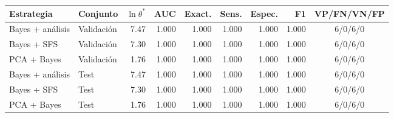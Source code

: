 \footnotesize
\begin{tabular}{llrrrrrrc}
\toprule
Estrategia & Conjunto & $\ln\theta^*$ & AUC & Exact. & Sens. & Espec. & F1 & VP/FN/VN/FP \\
\midrule
Bayes + análisis & Validación & 7.47 & 1.000 & 1.000 & 1.000 & 1.000 & 1.000 & 6/0/6/0 \\
Bayes + SFS & Validación & 7.30 & 1.000 & 1.000 & 1.000 & 1.000 & 1.000 & 6/0/6/0 \\
PCA + Bayes & Validación & 1.76 & 1.000 & 1.000 & 1.000 & 1.000 & 1.000 & 6/0/6/0 \\
\midrule
Bayes + análisis & Test & 7.47 & 1.000 & 1.000 & 1.000 & 1.000 & 1.000 & 6/0/6/0 \\
Bayes + SFS & Test & 7.30 & 1.000 & 1.000 & 1.000 & 1.000 & 1.000 & 6/0/6/0 \\
PCA + Bayes & Test & 1.76 & 1.000 & 1.000 & 1.000 & 1.000 & 1.000 & 6/0/6/0 \\
\bottomrule
\end{tabular}
